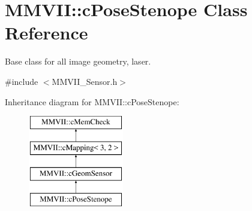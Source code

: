 \hypertarget{classMMVII_1_1cPoseStenope}{}\section{M\+M\+V\+II\+:\+:c\+Pose\+Stenope Class Reference}
\label{classMMVII_1_1cPoseStenope}


Base class for all image geometry, laser.  




{\ttfamily \#include $<$M\+M\+V\+I\+I\+\_\+\+Sensor.\+h$>$}

Inheritance diagram for M\+M\+V\+II\+:\+:c\+Pose\+Stenope\+:\begin{figure}[H]
\begin{center}
\leavevmode
\includegraphics[height=4.000000cm]{classMMVII_1_1cPoseStenope}
\end{center}
\end{figure}
